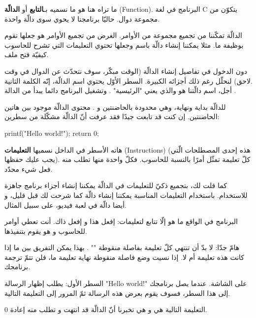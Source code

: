 ما تراه هنا هو ما نسميه بـ\textbf{التابع}
أو
\textbf{الدالّة}
(\textenglish{Function}).
 البرنامج في لغة
\textenglish{C}
 يتكوّن من مجموعة دوال. حاليّا برنامجنا لا يحوي سوى دالّة واحدة.

الدالّة تمكّننا من تجميع مجموعة من الأوامر. الغرض من تجميع الأوامر هو جعلها تقوم بوظيفة ما. مثلا يمكننا إنشاء دالّة باسم
 وجعلها تحتوي التعليمات التي تشرح للحاسوب كيفيّة فتح ملف.

 دون الدخول في تفاصيل إنشاء الدالّة (الوقت مبكّر، سوف نتحدّث عن الدوال في وقت لاحق) لنحلّل رغم ذلك أجزائه الكبيرة. السطر الأوّل يحتوي اسم الدالّة، إنّه الكلمة الثانية.\\
 أجل، اسم دالّتنا هو
والذي يعني
"الرئيسية"
. وتشغيل البرنامج دائما يبدأ من الدالة
.

للدالّة بداية ونهاية، وهي محدودة بالحاضنتين
\InlineCode{\{}
و
\InlineCode{\}}.
محتوى الدالّة موجود بين هاتين الحاضنتين. إن كنت قد تابعت جيدًا فقد عرفت أنّ الدالّة مشكّلة من سطرين:

\begin{Csource}
printf("Hello world!\n");
return 0;
\end{Csource}

هاته الأسطر في الداخل نسميها
\textbf{التعليمات}
(\textenglish{Instructions})
 (هذه إحدى المصطلحات الّتي يجب عليك حفظها). كلّ تعليمة تمثّل أمرًا بالنسبة للحاسوب. فكلّ واحدة منها تطلب منه فعل شيء محدّد.

 كما قلت لك، بتجميع ذكيّ للتعليمات في الدالّة يمكننا إنشاء أجزاء برنامج جاهزة للاستخدام. باستخدام التعليمات المناسبة يمكننا إنشاء دالّة
 كما شرحت لك قبل قليل، و أيضا دالّة
 في لعبة فيديو، على سبيل المثال.

 البرنامج في الواقع ما هو إلّا تتابع لتعليمات: إفعل هذا و إفعل ذاك. أنت تعطي أوامر للحاسوب و هو يقوم بتنفيذها.

 \begin{critical}
هامّ جدّا: لا بدّ أن تنتهي كلّ تعليمة بفاصلة منقوطة
"\InlineCode{;}"
. بهذا يمكن التفريق بين ما إذا كانت هذه تعليمة أم لا. إذا نسيت وضع فاصلة منقوطة نهاية تعليمة ما، فلن تتمّ ترجمة برنامجك.
 \end{critical}

 السطر الأول:
 يطلب إظهار الرسالة
 "\textenglish{Hello world!}"
  على الشاشة. عندما يصل برنامجك إلى هذا السطر، فسوف يقوم بعرض هذه الرسالة ثمّ المرور إلى التعليمة التالية.

  التعليمة التالية هي
 و هي تخبرنا أنّ الدالّة
 قد انتهت و تطلب منه إعادة 0.

